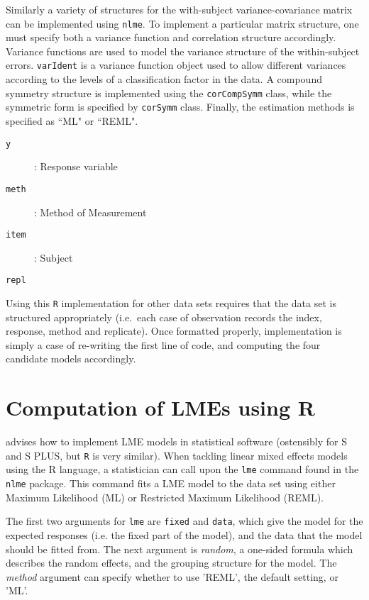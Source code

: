 \documentclass[12pt, a4paper]{report}
\theoremstyle{plain}
\theoremstyle{definition}
\theoremstyle{remark}
\begin{document}
Similarly a variety of structures for the with-subject variance-covariance matrix can be implemented using \texttt{nlme}. To implement a particular matrix structure, one must specify both a variance function and correlation structure accordingly. Variance functions are used to model the variance structure of the within-subject errors. \texttt{varIdent} is a variance function object used to allow different variances according to the levels of a classification factor in the data. A compound symmetry structure is implemented using the \texttt{corCompSymm} class, while the symmetric form is specified by \texttt{corSymm} class. Finally, the estimation methods is specified as ``ML" or ``REML".

\begin{description}
\item[\texttt{y}] : Response variable
\item[\texttt{meth}] : Method of Measurement
\item[\texttt{item}] : Subject
\item[\texttt{repl}] 
\end{description}

Using this \texttt{R} implementation for other data sets requires that the data set is structured appropriately (i.e.\ each case of observation records the index, response, method and replicate). Once formatted properly, implementation is simply a case of re-writing the first line of code, and computing the four candidate models accordingly.


\section{Computation of LMEs using R} 

\cite{PB} advises how to
implement LME models in statistical software (ostensibly for S and S PLUS, but \texttt{R} is very similar). When tackling linear mixed effects models using the R language, a statistician can call upon the \texttt{lme} command found in the \texttt{nlme} package. This command fits a LME model to the data set using either Maximum Likelihood (ML) or Restricted Maximum Likelihood (REML). 

The first two arguments for \texttt{lme} are \texttt{fixed} and \texttt{data}, which give the model for the expected responses (i.e. the fixed part of the model), and the data that the model should be fitted from. The next argument is  \emph{random}, a one-sided
formula which describes the random effects, and the grouping structure for the model. The  \emph{method} argument can specify whether to use 'REML', the default setting, or 'ML'.
\end{document}
